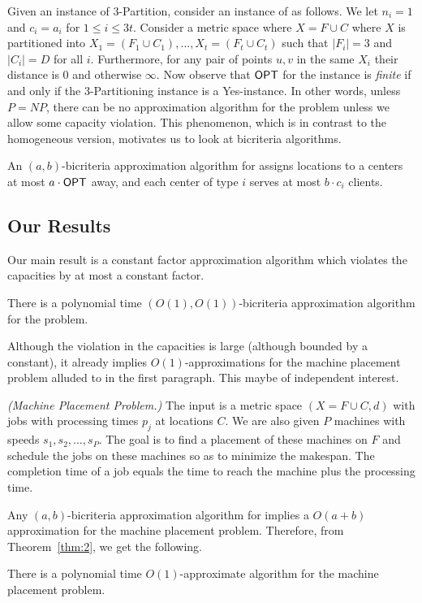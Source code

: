 Given an instance of $3$-Partition, consider an instance of \mckc as follows. We let $n_i = 1$ and $c_i = a_i$ for $1\leq i\leq 3t$. %
Consider a metric space where $X = F\cup C$ where $X$ is partitioned into $X_1 = (F_1\cup C_1),\ldots,X_t = (F_t\cup C_t)$ such that $|F_i| = 3$ and $|C_i| = D$ for all $i$.
Furthermore, for any pair of points $u,v$ in the same $X_i$ their distance is $0$ and otherwise $\infty$. 
Now observe that $\mathsf{OPT}$ for the \mckc instance is {\em finite} if and only if the $3$-Partitioning instance is a Yes-instance. In other words, unless $P=NP$, there can be no approximation algorithm for the problem
unless we allow some capacity violation. This phenomenon, which is in contrast to the homogeneous version, motivates us to look at bicriteria algorithms.

 \begin{definition}
 	An $(a,b)$-bicriteria approximation algorithm for \mckc assigns locations to a centers at most $a\cdot\mathsf{OPT}$ away, and each center of type $i$ serves at most $b\cdot c_i$ clients. %
 \end{definition}
 
\subsection{Our Results}
Our main result is a constant factor approximation algorithm which violates the capacities by at most a constant factor.
\begin{theorem}\label{thm:2}
	There is a polynomial time  $(O(1),O(1))$-bicriteria approximation algorithm for the \mckc problem.
\end{theorem}
Although the violation in the capacities is large (although bounded by a constant), it already implies $O(1)$-approximations for the machine placement problem alluded to in the first paragraph.
This maybe of independent interest.
\begin{definition}\emph{(Machine Placement Problem.)}
	The input is a metric space $(X=F\cup C,d)$ with jobs with processing times $p_j$ at locations $C$. We are also given $P$ machines with speeds $s_1,s_2,\ldots,s_P$.
	The goal is to find a placement of these machines on $F$ and schedule the jobs on these machines so as to minimize the makespan. The completion time of a job equals the time to reach the machine plus the processing time.
\end{definition}
Any $(a,b)$-bicriteria approximation algorithm for \mckc implies a $O(a+b)$ approximation for the machine placement problem. Therefore, from Theorem~\ref{thm:2}, we get the following.
\begin{theorem}\label{thm:mpp}
	There is a polynomial time $O(1)$-approximate algorithm for the machine placement problem.
\end{theorem}

